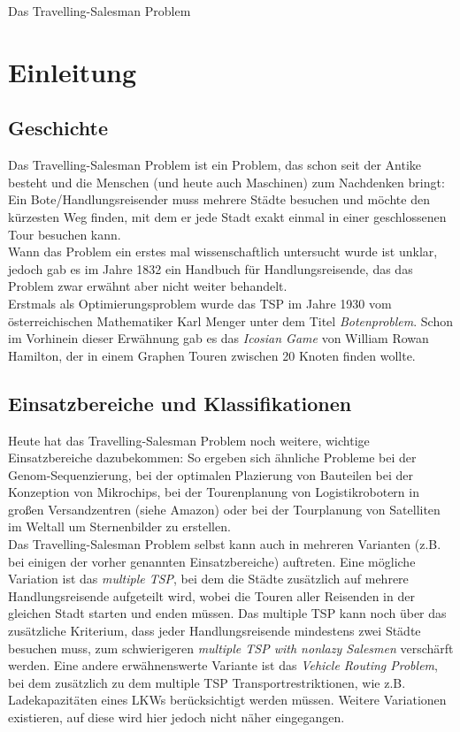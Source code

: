 \documentclass[a4paper, 11pt]{article}
\begin{document}
\tableofcontents
\newpage

Das Travelling-Salesman Problem

\section{Einleitung}

\subsection{Geschichte}

Das Travelling-Salesman Problem ist ein Problem, das schon seit der Antike
besteht und die Menschen (und heute auch Maschinen) zum Nachdenken bringt:
Ein Bote/Handlungsreisender muss mehrere Städte besuchen und möchte den
kürzesten Weg finden, mit dem er jede Stadt exakt einmal in einer geschlossenen
Tour besuchen kann. \\

Wann das Problem ein erstes mal wissenschaftlich untersucht wurde ist unklar,
jedoch gab es im Jahre 1832 ein Handbuch für Handlungsreisende, das das Problem
zwar erwähnt aber nicht weiter behandelt.\\

Erstmals als Optimierungsproblem wurde das TSP im Jahre 1930 vom österreichischen
Mathematiker Karl Menger unter dem Titel \textit{Botenproblem}. Schon im
Vorhinein dieser Erwähnung gab es das \textit{Icosian Game} von William Rowan
Hamilton, der in einem Graphen Touren zwischen 20 Knoten finden wollte.\\

\subsection{Einsatzbereiche und Klassifikationen}

Heute hat das Travelling-Salesman Problem noch weitere, wichtige Einsatzbereiche
dazubekommen: So ergeben sich ähnliche Probleme bei der Genom-Sequenzierung, bei
der optimalen Plazierung von Bauteilen bei der Konzeption von Mikrochips, bei
der Tourenplanung von Logistikrobotern in großen Versandzentren (siehe Amazon)
oder bei der Tourplanung von Satelliten im Weltall um Sternenbilder zu erstellen.\\

Das Travelling-Salesman Problem selbst kann auch in mehreren Varianten (z.B.
bei einigen der vorher genannten Einsatzbereiche) auftreten. Eine mögliche
Variation ist das \textit{multiple TSP}, bei dem die Städte zusätzlich auf
mehrere Handlungsreisende aufgeteilt wird, wobei die Touren aller Reisenden
in der gleichen Stadt starten und enden müssen. Das multiple TSP kann noch
über das zusätzliche Kriterium, dass jeder Handlungsreisende mindestens zwei
Städte besuchen muss, zum schwierigeren \textit{multiple TSP with nonlazy
Salesmen} verschärft werden. Eine andere erwähnenswerte Variante ist das
\textit{Vehicle Routing Problem}, bei dem zusätzlich zu dem multiple TSP
Transportrestriktionen, wie z.B. Ladekapazitäten eines LKWs berücksichtigt werden
müssen. Weitere Variationen existieren, auf diese wird hier jedoch nicht näher
eingegangen.
\end{document}
